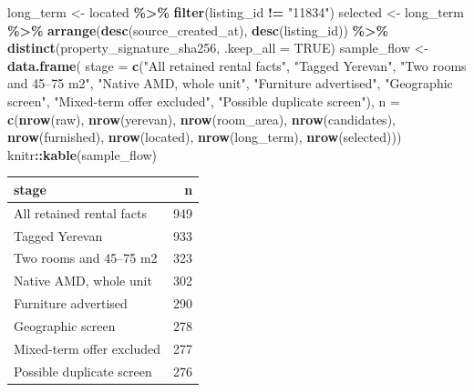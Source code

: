 \documentclass[
]{article}
\newenvironment{Shaded}{\begin{snugshade}}{\end{snugshade}}
\newcommand{\AttributeTok}[1]{\textcolor[rgb]{0.13,0.29,0.53}{#1}}
\newcommand{\ConstantTok}[1]{\textcolor[rgb]{0.56,0.35,0.01}{#1}}
\newcommand{\FunctionTok}[1]{\textcolor[rgb]{0.13,0.29,0.53}{\textbf{#1}}}
\newcommand{\NormalTok}[1]{#1}
\newcommand{\OtherTok}[1]{\textcolor[rgb]{0.56,0.35,0.01}{#1}}
\newcommand{\SpecialCharTok}[1]{\textcolor[rgb]{0.81,0.36,0.00}{\textbf{#1}}}
\newcommand{\StringTok}[1]{\textcolor[rgb]{0.31,0.60,0.02}{#1}}
\newcounter{none} %
\begin{document}
\begin{Shaded}
\begin{Highlighting}[]
\NormalTok{long\_term }\OtherTok{\textless{}{-}}\NormalTok{ located }\SpecialCharTok{\%\textgreater{}\%} \FunctionTok{filter}\NormalTok{(listing\_id }\SpecialCharTok{!=} \StringTok{"11834"}\NormalTok{)}
\NormalTok{selected }\OtherTok{\textless{}{-}}\NormalTok{ long\_term }\SpecialCharTok{\%\textgreater{}\%}
  \FunctionTok{arrange}\NormalTok{(}\FunctionTok{desc}\NormalTok{(source\_created\_at), }\FunctionTok{desc}\NormalTok{(listing\_id)) }\SpecialCharTok{\%\textgreater{}\%}
  \FunctionTok{distinct}\NormalTok{(property\_signature\_sha256, }\AttributeTok{.keep\_all =} \ConstantTok{TRUE}\NormalTok{)}
\NormalTok{sample\_flow }\OtherTok{\textless{}{-}} \FunctionTok{data.frame}\NormalTok{(}
  \AttributeTok{stage =} \FunctionTok{c}\NormalTok{(}\StringTok{"All retained rental facts"}\NormalTok{, }\StringTok{"Tagged Yerevan"}\NormalTok{, }\StringTok{"Two rooms and 45–75 m2"}\NormalTok{, }\StringTok{"Native AMD, whole unit"}\NormalTok{,}
            \StringTok{"Furniture advertised"}\NormalTok{, }\StringTok{"Geographic screen"}\NormalTok{, }\StringTok{"Mixed{-}term offer excluded"}\NormalTok{, }\StringTok{"Possible duplicate screen"}\NormalTok{),}
  \AttributeTok{n =} \FunctionTok{c}\NormalTok{(}\FunctionTok{nrow}\NormalTok{(raw), }\FunctionTok{nrow}\NormalTok{(yerevan), }\FunctionTok{nrow}\NormalTok{(room\_area), }\FunctionTok{nrow}\NormalTok{(candidates),}
        \FunctionTok{nrow}\NormalTok{(furnished), }\FunctionTok{nrow}\NormalTok{(located), }\FunctionTok{nrow}\NormalTok{(long\_term), }\FunctionTok{nrow}\NormalTok{(selected)))}
\NormalTok{knitr}\SpecialCharTok{::}\FunctionTok{kable}\NormalTok{(sample\_flow)}
\end{Highlighting}
\end{Shaded}

{\def\LTcaptype{none} %
\begin{longtable}[]{@{}lr@{}}
\toprule\noalign{}
stage & n \\
\midrule\noalign{}
\endhead
\bottomrule\noalign{}
\endlastfoot
All retained rental facts & 949 \\
Tagged Yerevan & 933 \\
Two rooms and 45--75 m2 & 323 \\
Native AMD, whole unit & 302 \\
Furniture advertised & 290 \\
Geographic screen & 278 \\
Mixed-term offer excluded & 277 \\
Possible duplicate screen & 276 \\
\end{longtable}
}
\end{document}
